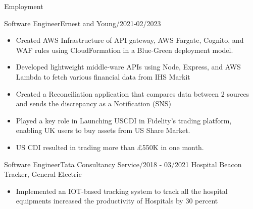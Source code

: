 \documentclass[]{mcdowellcv}
\begin{document}
\begin{cvsection}{Employment}
\begin{cvsubsection}{Software Engineer}{Ernest and Young}{/2021-02/2023}
\begin{itemize}
                \item Created AWS Infrastructure of API gateway, AWS Fargate, Cognito, and WAF rules using CloudFormation in a Blue-Green deployment model.
                \item Developed lightweight middle-ware APIs using Node, Express, and AWS Lambda to fetch various financial data from IHS Markit
                \item Created a Reconciliation application that compares data between 2 sources and sends the discrepancy as a
                Notification (SNS)
                \item Played a key role in Launching USCDI in Fidelity's trading platform, enabling UK users to buy assets from US Share Market.
                \item US CDI resulted in trading more than £550K in one month.
            \end{itemize}
        \end{cvsubsection}
%
        \begin{cvsubsection}{Software Engineer}{Tata Consultancy Service}{/2018 - 03/2021}
            Hospital Beacon Tracker, General Electric
            \begin{itemize}
                \item Implemented an IOT-based tracking system to track all the hospital equipments increased the productivity of Hospitals by 30 percent

\end{itemize}
\end{cvsubsection}
\end{cvsection}
\end{document}

